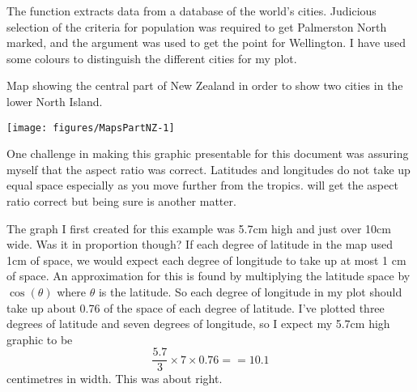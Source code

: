 The  function extracts data from a database of the world's cities. Judicious selection of the criteria for population was required to get Palmerston North marked, and the  argument was used to get the point for Wellington. I have used some colours to distinguish the different cities for my plot. 
 
\begin{exhibit} 
\caption{Map showing the central part of New Zealand in order to show two cities in the lower North Island.} 
\label{PartNZ} 
\begin{center} 
\begin{knitrout}
\color{fgcolor}\begin{kframe}
\begin{alltt}
\hlstd{> }\hlstd{(}\hlstd{,} \hlstd{=}\hlstd{(}\hlopt{-}\hlstd{,}\hlopt{-}\hlstd{),} \hlstd{=}\hlstd{(}\hlstd{,}\hlstd{),}  \hlstd{=}\hlstd{)}
\hlstd{> }\hlstd{()}
\hlstd{> }\hlstd{(}\hlstd{=}\hlstd{,}\hlstd{=}\hlstd{,} \hlstd{=}\hlstd{,} \hlstd{=}\hlstd{,} \hlstd{=}\hlstd{)}
\hlstd{> }\hlstd{(}\hlstd{=}\hlstd{,} \hlstd{=}\hlstd{,} \hlstd{=}\hlstd{)}
\end{alltt}
\end{kframe}
\texttt{[image: figures/MapsPartNZ-1]} 

\end{knitrout}
\end{center} 
\end{exhibit} 
 
One challenge in making this graphic presentable for this document  
was assuring myself that the aspect ratio was correct. Latitudes and longitudes do not take up equal space especially as you move further from the tropics. \R{} will get the aspect ratio correct but being sure is another matter.  
 
The graph I first created for this example was 5.7cm high and just over 10cm wide. Was it in proportion though? If each degree of latitude in the map used 1cm of space, we would expect each degree of longitude to take up at most 1 cm of space. An approximation for this is found by multiplying the latitude space by $\cos(\theta)$ where $\theta$ is the latitude. So each degree of longitude in my plot should take up about 0.76 of the space of each degree of latitude. I've plotted three degrees of latitude and seven degrees of longitude, so I expect my 5.7cm high graphic to be  
$$ \frac{5.7}{3} \times 7 \times 0.76 == 10.1 $$ 
centimetres in width. This was about right.  
 
